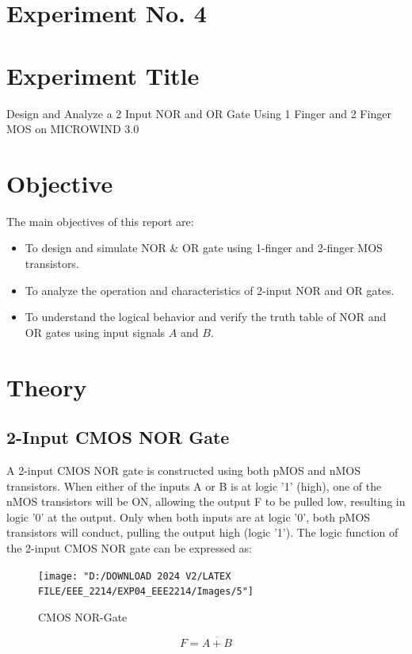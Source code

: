 \documentclass[a4paper,12pt]{article}
\begin{document}
	\section{Experiment No. 4}
	
	
	\section{Experiment Title }
	Design and Analyze a 2 Input NOR and OR Gate Using 1 Finger and 2 Finger MOS on
	MICROWIND 3.0
	\section{Objective}
	The main objectives of this report are:
	\begin{itemize}
		\item To design and simulate NOR \& OR gate using 1-finger and 2-finger MOS transistors.
		\item To analyze the operation and characteristics of 2-input NOR and OR gates.
		\item To understand the logical behavior and verify the truth table of NOR and OR gates using input signals \(A\) and \(B\).
	\end{itemize}
	\section{Theory}
	
	
	\subsection{2-Input CMOS NOR Gate}
A 2-input CMOS NOR gate is constructed using both pMOS and nMOS transistors. When either of the inputs A or B is at logic '1' (high), one of the nMOS transistors will be ON, allowing the output F to be pulled low, resulting in logic '0' at the output. Only when both inputs are at logic '0', both pMOS transistors will conduct, pulling the output high (logic '1'). The logic function of the 2-input CMOS NOR gate can be expressed as:


	
	
	\begin{figure}[H]
		\centering
		\texttt{[image: "D:/DOWNLOAD 2024 V2/LATEX FILE/EEE\_2214/EXP04\_EEE2214/Images/5"]}
		\caption{CMOS NOR-Gate}
		\label{fig:7}
	\end{figure}
	
\[
F = \overline{A + B}
\]
\end{document}
